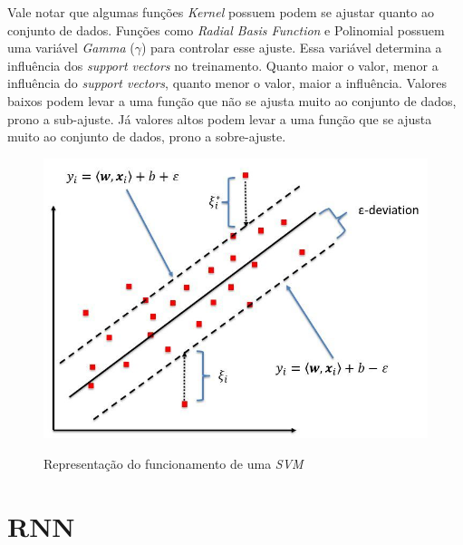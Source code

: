 Vale notar que algumas funções \textit{Kernel} possuem podem se ajustar quanto ao conjunto de dados. Funções como \textit{Radial Basis Function} e Polinomial possuem uma variável \textit{Gamma} (\(\gamma\)) para controlar esse ajuste. Essa variável determina a influência dos \textit{support vectors} no treinamento. Quanto maior o valor, menor a influência do \textit{support vectors}, quanto menor o valor, maior a influência. Valores baixos podem levar a uma função que não se ajusta muito ao conjunto de dados, prono a sub-ajuste. Já valores altos podem levar a uma função que se ajusta muito ao conjunto de dados, prono a sobre-ajuste.

\begin{figure}[htbp]
    \centering
    \includegraphics[scale=1.0]{monography/img/models/svr_example.png}
    \label{figure:support_vector_machine}
    \caption[Representação do funcionamento de uma \textit{\acrshort{SVM}}]{Representação do funcionamento de uma \textit{\acrshort{SVM}}\footnotemark}
\end{figure}



\section{\acrfull{RNN}}


